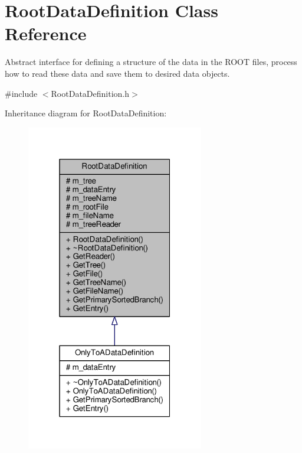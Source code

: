\hypertarget{classRootDataDefinition}{\section{Root\+Data\+Definition Class Reference}
\label{classRootDataDefinition}
}


Abstract interface for defining a structure of the data in the R\+O\+O\+T files, process how to read these data and save them to desired data objects.  




{\ttfamily \#include $<$Root\+Data\+Definition.\+h$>$}



Inheritance diagram for Root\+Data\+Definition\+:\nopagebreak
\begin{figure}[H]
\begin{center}
\leavevmode
\includegraphics[width=220pt]{classRootDataDefinition__inherit__graph}
\end{center}
\end{figure}


